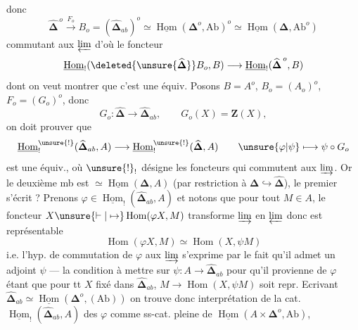 donc
\[
\widehat{\boldsymbol\Delta}^{\,o}\xrightarrow{F_o}
B_o=(\widehat{\boldsymbol\Delta}_{ab})^o
\simeq\underline{\operatorname{Hom}}(\boldsymbol\Delta^o,\mathrm{Ab})^o
\simeq\underline{\operatorname{Hom}}(\boldsymbol\Delta,\mathrm{Ab}^o)
\]
commutant aux $\varprojlim$
d'où le foncteur
\[
\underline{\operatorname{Hom}}_!(\deleted{\unsure{\widehat{\boldsymbol\Delta}}}B_o,B)
\longrightarrow\underline{\operatorname{Hom}}_!(\widehat{\boldsymbol\Delta}^{\,o},B)
\]
dont on veut montrer que c'est une équiv. Posons
$B=A^o$, $B_o=(A_o)^o$,  $F_o=(G_o)^o$, donc
\[
G_o:\widehat{\boldsymbol\Delta}\longrightarrow\widehat{\boldsymbol\Delta}_{ab},\qquad G_o(X)=\mathbf Z(X),
\]
on doit prouver que
\[
\underline{\operatorname{Hom}}^{\unsure{!}}_!(\widehat{\boldsymbol\Delta}_{ab},A)
\longrightarrow\underline{\operatorname{Hom}}^{\unsure{!}}_!(\widehat{\boldsymbol\Delta},A)
\qquad\unsure{\varphi|\psi}\longmapsto\psi\circ G_o
\]
est une équiv., où $\unsure{!}_!$ désigne les foncteurs
qui commutent aux $\varinjlim$. Or
le deuxième mb est $\simeq\underline{\operatorname{Hom}}(\boldsymbol\Delta,A)$
(par restriction à $\boldsymbol\Delta\hookrightarrow\widehat{\boldsymbol\Delta}$),  le
premier s'écrit ?  Prenons $\varphi\in\underline{\operatorname{Hom}}_!(\widehat{\boldsymbol\Delta}_{ab},A)$
et notons que pour tout $M\in A$,  le
foncteur $X\unsure{\vdash|\mapsto}\operatorname{Hom}(\varphi X,M)$ transforme $\varinjlim$
en $\varprojlim$ donc est représentable
\[
\operatorname{Hom}(\varphi X,M)\simeq\operatorname{Hom}(X,\psi M)
\]
i.e. l'hyp. de commutation de $\varphi$ aux $\varinjlim$
s'exprime par le fait qu'il admet un
adjoint $\psi$ --- la condition à mettre sur \deleted{\unsure{\varphi}}
$\psi:A\longrightarrow\widehat{\boldsymbol\Delta}_{ab}$ pour qu'il provienne de $\varphi$
étant que pour tt $X$ fixé dans $\widehat{\boldsymbol\Delta}_{ab}$, $M\longrightarrow\operatorname{Hom}(X,\psi M)$
soit repr. Ecrivant $\widehat{\boldsymbol\Delta}_{ab}\simeq\underline{\operatorname{Hom}}(\boldsymbol\Delta^o,(\mathrm{Ab}))$
on trouve donc interprétation de la
cat. $\underline{\operatorname{Hom}}_!(\widehat{\boldsymbol\Delta}_{ab},A)$ des $\varphi$ comme ss-cat. pleine
de $\underline{\operatorname{Hom}}(A\times\boldsymbol\Delta^o,\mathrm{Ab})$,
